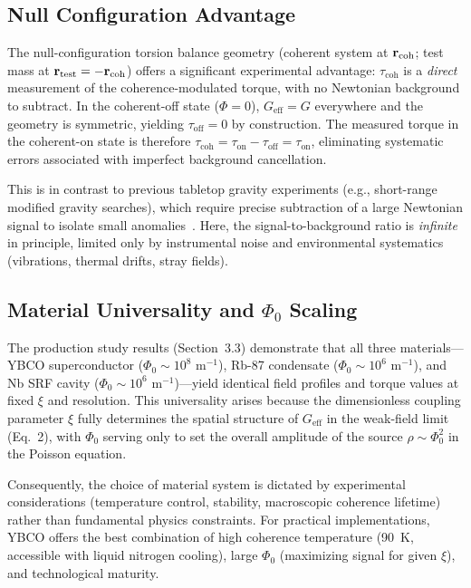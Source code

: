 \documentclass[10pt,twocolumn]{article}
\begin{document}
\subsection{Null Configuration Advantage}

The null-configuration torsion balance geometry (coherent system at ${\bf r}_{\text{coh}}$; test mass at ${\bf r}_{\text{test}} = -{\bf r}_{\text{coh}}$) offers a significant experimental advantage: $\tau_{\text{coh}}$ is a \textit{direct} measurement of the coherence-modulated torque, with no Newtonian background to subtract. In the coherent-off state ($\Phi = 0$), $G_{\text{eff}} = G$ everywhere and the geometry is symmetric, yielding $\tau_{\text{off}} = 0$ by construction. The measured torque in the coherent-on state is therefore $\tau_{\text{coh}} = \tau_{\text{on}} - \tau_{\text{off}} = \tau_{\text{on}}$, eliminating systematic errors associated with imperfect background cancellation.

This is in contrast to previous tabletop gravity experiments (e.g., short-range modified gravity searches), which require precise subtraction of a large Newtonian signal to isolate small anomalies~\cite{eotwash2008}. Here, the signal-to-background ratio is \textit{infinite} in principle, limited only by instrumental noise and environmental systematics (vibrations, thermal drifts, stray fields).

\subsection{Material Universality and $\Phi_0$ Scaling}

The production study results (Section~3.3) demonstrate that all three materials---YBCO superconductor ($\Phi_0 \sim 10^8$ m$^{-1}$), Rb-87 condensate ($\Phi_0 \sim 10^6$ m$^{-1}$), and Nb SRF cavity ($\Phi_0 \sim 10^6$ m$^{-1}$)---yield identical field profiles and torque values at fixed $\xi$ and resolution. This universality arises because the dimensionless coupling parameter $\xi$ fully determines the spatial structure of $G_{\text{eff}}$ in the weak-field limit (Eq.~2), with $\Phi_0$ serving only to set the overall amplitude of the source $\rho \sim \Phi_0^2$ in the Poisson equation.

Consequently, the choice of material system is dictated by experimental considerations (temperature control, stability, macroscopic coherence lifetime) rather than fundamental physics constraints. For practical implementations, YBCO offers the best combination of high coherence temperature (90~K, accessible with liquid nitrogen cooling), large $\Phi_0$ (maximizing signal for given $\xi$), and technological maturity.
\end{document}
